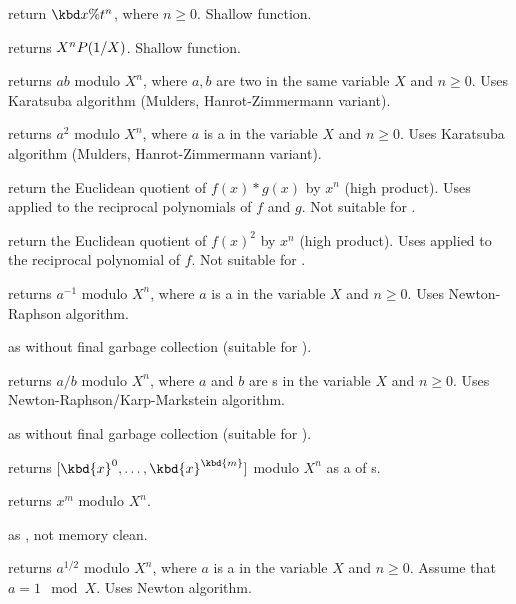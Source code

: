  return $\kbd{x \% } t^n$,
where $n\geq 0$. Shallow function.

 returns $X^n\*P(1/X)$. Shallow function.

 returns $a b$ modulo $X^n$,
where $a,b$ are two  in the same variable $X$ and $n \geq 0$. Uses
Karatsuba algorithm (Mulders, Hanrot-Zimmermann variant).

 returns $a^2$ modulo $X^n$,
where $a$ is a  in the variable $X$ and $n \geq 0$. Uses
Karatsuba algorithm (Mulders, Hanrot-Zimmermann variant).

 return the Euclidean quotient
of $f(x)*g(x)$ by $x^n$ (high product). Uses  applied to
the reciprocal polynomials of $f$ and $g$. Not suitable for .

 return the Euclidean quotient
of $f(x)^2$ by $x^n$ (high product). Uses  applied to
the reciprocal polynomial of $f$. Not suitable for .

 returns $a^{-1}$ modulo $X^n$,
where $a$ is a  in the variable $X$ and $n \geq 0$. Uses
Newton-Raphson algorithm.

 as  without final garbage
collection (suitable for ).

 returns $a/b$ modulo $X^n$,
where $a$ and $b$ are s in the variable $X$ and $n \geq 0$. Uses
Newton-Raphson/Karp-Markstein algorithm.

 as  without final garbage
collection (suitable for ).

 returns $[\kbd{x}^0,
\dots, \kbd{x}^\kbd{m}]$ modulo $X^n$ as a  of s.

 returns $x^m$ modulo
$X^n$.

 as ,
not memory clean.

 returns $a^{1/2}$ modulo $X^n$,
where $a$ is a  in the variable $X$ and $n \geq 0$.
Assume that $a = 1 \mod{X}$. Uses Newton algorithm.

